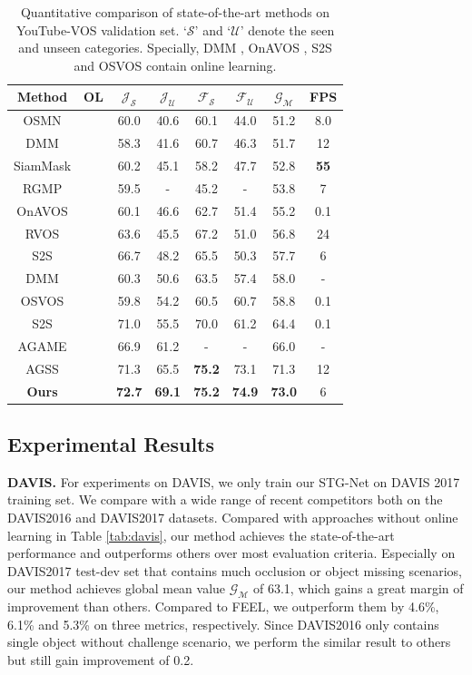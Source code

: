 \documentclass[letterpaper]{article} %
\newcommand{\cmark}{\ding{52}}%
\newcommand{\xmark}{\ding{56}}%
\begin{document}
\begin{table}[t!]
\small
\centering
\begin{tabular}{c|c|cccc|c|c}
\hline
Method & OL & $\mathcal{J}_\mathcal{S}$ & $\mathcal{J}_\mathcal{U}$ & $\mathcal{F}_\mathcal{S}$ & $\mathcal{F}_\mathcal{U}$ & $\mathcal{G}_\mathcal{M}$ & FPS \\ \hline
OSMN & \xmark & 60.0 & 40.6 & 60.1 & 44.0 & 51.2 & 8.0 \\
DMM & \xmark & 58.3 & 41.6 & 60.7 & 46.3 & 51.7 & 12 \\
SiamMask & \xmark & 60.2 & 45.1 & 58.2 & 47.7 & 52.8 & \textbf{55} \\
RGMP & \xmark & 59.5 & - & 45.2 & - & 53.8 & 7 \\
OnAVOS  & \cmark & 60.1 & 46.6 & 62.7 & 51.4 & 55.2 & 0.1 \\
RVOS & \xmark & 63.6 & 45.5 & 67.2 & 51.0 & 56.8 & 24 \\
S2S & \xmark & 66.7 & 48.2 & 65.5 & 50.3 & 57.7 & 6 \\
DMM & \cmark & 60.3 & 50.6 & 63.5 & 57.4 & 58.0 & - \\
OSVOS & \cmark & 59.8 & 54.2 & 60.5 & 60.7 & 58.8 & 0.1 \\
S2S & \cmark & 71.0 & 55.5 & 70.0 & 61.2 & 64.4 & 0.1 \\
AGAME & \xmark & 66.9 & 61.2 & - & - & 66.0 & - \\
AGSS & \xmark & 71.3 & 65.5 & \textbf{75.2} & 73.1 & 71.3 & 12 \\ \hline
\textbf{Ours} & \xmark & \textbf{72.7} & \textbf{69.1} & \textbf{75.2} & \textbf{74.9} & \textbf{73.0} & 6\\ \hline
\end{tabular}
\caption{Quantitative comparison of state-of-the-art methods on YouTube-VOS validation set. `$\mathcal{S}$' and `$\mathcal{U}$' denote the seen and unseen categories. Specially, DMM \cite{zeng2019dmm}, OnAVOS \cite{voigtlaender2017online}, S2S \cite{xu2018youtube} and OSVOS \cite{caelles2017one} contain online learning.}
\label{tab:youtubevos}
\vspace{-10pt}
\end{table}

\subsection{Experimental Results}

\textbf{DAVIS.}
For experiments on DAVIS, we only train our STG-Net on DAVIS 2017 training set. We compare with a wide range of recent competitors both on the DAVIS2016 and DAVIS2017 datasets. Compared with approaches without online learning in Table \ref{tab:davis}, our method achieves the state-of-the-art performance and outperforms others over most evaluation criteria. Especially on DAVIS2017 test-dev set that contains much occlusion or object missing scenarios, our method achieves global mean value $\mathcal{G}_\mathcal{M}$ of 63.1, which gains a great margin of improvement than others. Compared to FEEL, we outperform them by 4.6\%, 6.1\% and 5.3\% on three metrics, respectively. Since DAVIS2016 only contains single object without challenge scenario, we perform the similar result to others but still gain improvement of 0.2.
\end{document}
